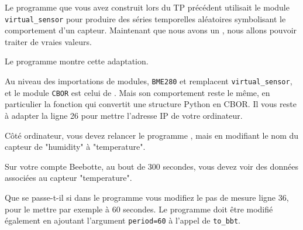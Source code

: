 Le programme que vous avez construit lors du TP précédent utilisait le module \texttt{virtual\_sensor} pour produire des séries temporelles aléatoires symbolisant le comportement d'un capteur. Maintenant que nous avons un , nous allons pouvoir traiter de vraies valeurs.

     \vspace{1em}

Le programme  montre cette adaptation.

\label{prog-wifi-temp}

Au niveau des importations de modules, \texttt{BME280} et \texttt{} remplacent \texttt{virtual\_sensor}, et le module \texttt{CBOR} est celui de \texttt{}. 
Mais son comportement reste le même, en particulier la fonction  qui convertit une structure Python en CBOR. Il vous reste à adapter la ligne 26 pour mettre l’adresse IP de votre ordinateur.

     \vspace{1em}

Côté ordinateur, vous devez relancer le programme , mais en modifiant le nom du capteur de "humidity" à "temperature". 

     \vspace{1em}

Sur votre compte Beebotte, au bout de 300 secondes, vous devez voir des données associées au capteur "temperature".

{Que se passe-t-il si dans le programme  vous modifiez le pas de mesure ligne 36, pour le mettre par exemple à 60 secondes.}
{
Le programme  doit être modifié également en ajoutant l'argument \texttt{period=60} à l'appel de \texttt{to\_bbt}.
}

